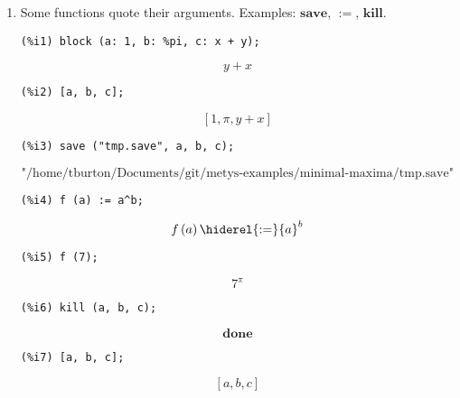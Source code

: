 \documentclass[12pt,leqno]{article}
\begin{document}
\begin{enumerate}
\item Some functions quote their arguments.
Examples: $\mathbf{save}$, $\mathbf{:=}$, $\mathbf{kill}$.
\begin{verbatim}
(%i1) block (a: 1, b: %pi, c: x + y);
\end{verbatim}
\begin{dmath}[number={\(\mathop{\mathrm{\%o}_{1}}\)}]
y+x
\end{dmath}
\begin{verbatim}
(%i2) [a, b, c];
\end{verbatim}
\begin{dmath}[number={\(\mathop{\mathrm{\%o}_{2}}\)}]
\left[1, \pi, y+x\right]
\end{dmath}
\begin{verbatim}
(%i3) save ("tmp.save", a, b, c);
\end{verbatim}
\begin{dmath}[number={\(\mathop{\mathrm{\%o}_{3}}\)}]
\mbox{"/home/tburton/Documents/git/metys-examples/minimal-maxima/tmp.save"}
\end{dmath}
\begin{verbatim}
(%i4) f (a) := a^b;
\end{verbatim}
\begin{dmath}[number={\(\mathop{\mathrm{\%o}_{4}}\)}]
f\left(a\right) \hiderel{:=} {a}^{b}
\end{dmath}
\begin{verbatim}
(%i5) f (7);
\end{verbatim}
\begin{dmath}[number={\(\mathop{\mathrm{\%o}_{5}}\)}]
{7}^{\pi}
\end{dmath}
\begin{verbatim}
(%i6) kill (a, b, c);
\end{verbatim}
\begin{dmath}[number={\(\mathop{\mathrm{\%o}_{6}}\)}]
\mathop{\mathbf{done}}
\end{dmath}
\begin{verbatim}
(%i7) [a, b, c];
\end{verbatim}
\begin{dmath}[number={\(\mathop{\mathrm{\%o}_{7}}\)}]
\left[a, b, c\right]
\end{dmath}



\end{enumerate}
\end{document}
